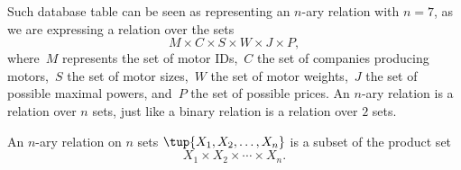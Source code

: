 \begin{table}[h]
    \centering
    \caption{A simplified catalogue of motors.}
    \label{tab:electric_motors}
\end{table}



Such database table can be seen as representing an $n$-ary relation with $n = 7$, as we are expressing a relation
over the sets
\begin{equation*}
    M\times C\times S\times W\times J\times P,
\end{equation*}
where~$M$ represents the set of motor IDs,~$C$ the set of companies producing motors,~$S$ the set of motor sizes,~$W$ the set of motor weights,~$J$ the set of possible maximal powers, and~$P$ the set of possible prices.  An $n$-ary relation is a relation over $n$ sets, just like a binary relation is a
relation over $2$ sets.
\begin{definition}
An $n$-ary relation on $n$ sets $\tup{X_1, X_2, \dots, X_n}$ is a
subset of the product set
\begin{equation}
X_1 \times X_2 \times \cdots \times X_n.
\end{equation}
\end{definition}

